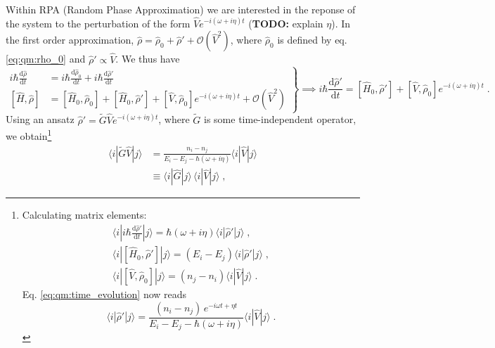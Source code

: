 \documentclass[a4paper,12pt]{article}
\begin{document}
    Within RPA (Random Phase Approximation) we are interested in the reponse of the system to the perturbation of the form $\hat V e^{-i(\omega + i\eta) t}$ (\textbf{TODO:} explain $\eta$). In the first order approximation, $\hat\rho = \hat\rho_0 + \hat\rho' + \mathcal{O}(\hat V^2)$, where $\hat\rho_0$ is defined by eq. \eqref{eq:qm:rho_0} and $\hat\rho' \propto \hat V$. We thus have
    \begin{equation} \label{eq:qm:time_evolution}
        \left.
        \begin{aligned}
            i\hbar \frac{\text{d}\hat\rho}{\text{d}t} &= i\hbar \frac{\text{d}\hat\rho_0}{\text{d}t} + i\hbar\frac{\text{d}\hat\rho'}{\text{d}t} \\
            [\hat H, \hat\rho] &= [\hat H_0, \hat \rho_0] + [\hat H_0, \hat \rho'] + [\hat V, \hat \rho_0] e^{-i (\omega + i\eta) t} + \mathcal{O}(\hat V^2)
        \end{aligned} \right\} \implies
        i\hbar \frac{\text{d}\hat\rho'}{\text{d}t} = [\hat H_0, \hat \rho'] + [\hat V, \hat \rho_0] e^{-i (\omega + i\eta) t}\; .
    \end{equation}
    Using an ansatz $\hat\rho' = \widetilde G \hat V e^{-i (\omega + i\eta) t}$, where $\widetilde G$ is some time-independent operator, we obtain\footnote{ %
    Calculating matrix elements:
    \begin{equation*}
    \begin{gathered}
        \langle i | i\hbar \frac{\text{d}\hat\rho'}{\text{d}t} | j \rangle = 
            \hbar(\omega + i\eta)\langle i| \hat\rho' | j \rangle\; , \\
        \langle i | [\hat H_0, \hat\rho'] | j \rangle = (E_i - E_j) \langle i| \hat\rho' | j \rangle\; , \\
        \langle i | [\hat V, \hat\rho_0] | j \rangle = (n_j - n_i) \langle i| \hat V | j \rangle\; .
    \end{gathered}
    \end{equation*}
    Eq. \eqref{eq:qm:time_evolution} now reads
    \begin{equation*}
         \langle i| \hat\rho' |j\rangle =
            \frac{(n_i - n_j)\, e^{-i\omega t + \eta t}}{E_i - E_j - \hbar(\omega + i\eta)} \langle i| \hat V |j \rangle \; .
    \end{equation*}
} %
    \begin{equation*} 
    \begin{aligned}
        \langle i | \widetilde G \hat V | j \rangle 
            &= \frac{n_i - n_j}{E_i - E_j - \hbar(\omega + i\eta)}\langle i | \hat V | j \rangle \\
            &\equiv \langle i | \hat G | j \rangle \, \langle i | \hat V | j \rangle\; ,
    \end{aligned}
    \end{equation*}
\end{document}
